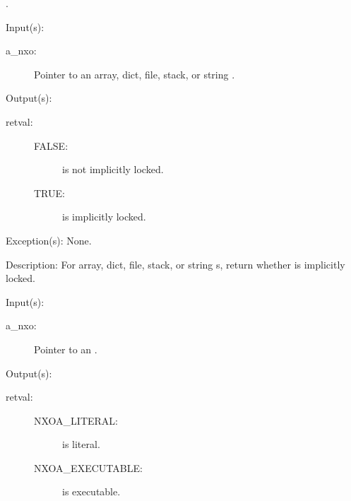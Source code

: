 \begin{capi}
\begin{capilist}
		.
	\end{capilist}
\label{nxo_ilocked}
	\begin{capilist}
	\item[Input(s): ]
		\begin{description}\item[]
		\item[a\_nxo: ]
			Pointer to an array, dict, file, stack, or string
			.
		\end{description}
	\item[Output(s): ]
		\begin{description}\item[]
		\item[retval: ]
			\begin{description}\item[]
			\item[FALSE: ]
				 is not implicitly locked.
			\item[TRUE: ]
				 is implicitly locked.
			\end{description}
		\end{description}
	\item[Exception(s): ] None.
	\item[Description: ]
		For array, dict, file, stack, or string s,
		return whether  is implicitly locked.
	\end{capilist}
\label{nxo_attr_get}
	\begin{capilist}
	\item[Input(s): ]
		\begin{description}\item[]
		\item[a\_nxo: ]
			Pointer to an \classname{nxo}.
		\end{description}
	\item[Output(s): ]
		\begin{description}\item[]
		\item[retval: ]
			\begin{description}\item[]
			\item[NXOA\_LITERAL: ]
				 is literal.
			\item[NXOA\_EXECUTABLE: ]
				 is executable.

\end{description}
\end{description}
\end{capilist}
\end{capi}
